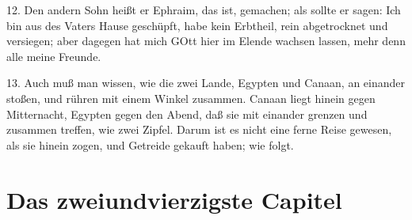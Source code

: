 12. Den andern Sohn heißt er Ephraim, das ist, gemachen; als sollte er sagen: Ich bin aus des Vaters Hause geschüpft, habe kein Erbtheil, rein abgetrocknet und versiegen; aber dagegen hat mich GOtt hier im Elende wachsen lassen, mehr denn alle meine Freunde.

13. Auch muß man wissen, wie die zwei Lande, Egypten und Canaan, an einander stoßen, und rühren mit einem Winkel zusammen. Canaan liegt hinein gegen Mitternacht, Egypten gegen den Abend, daß sie mit einander grenzen und zusammen treffen, wie zwei Zipfel. Darum ist es nicht eine ferne Reise gewesen, als sie hinein zogen, und Getreide gekauft haben; wie folgt.

\section{Das zweiundvierzigste Capitel}

